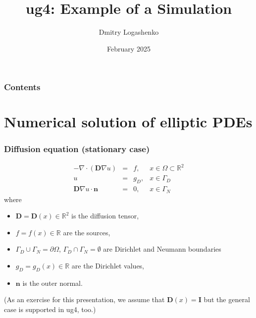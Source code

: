 \documentclass[xcolor=dvipsnames]{beamer}
\title
 [ug4: 1st simulation]
 {ug4: Example of a Simulation}
\author [D. Logashenko] {Dmitry Logashenko}
\institute [CEMSE]
{CEMSE, KAUST, Saudi Arabia}
\date [Feb. 2025] {February 2025}
\begin{document}
\frame {\titlepage}

\begin {frame} [t]
\frametitle {Contents}
\tableofcontents
\end {frame}

\section {Numerical solution of elliptic PDEs}

\begin {frame} [t]
\frametitle {Diffusion equation (stationary case)}
$$
 \begin{array} {rcll}
  - \nabla \cdot (\mathbf{D} \nabla u) & = & f, & x \in \Omega \subset \mathbb{R}^2 \\
  u & = & g_D, & x \in \Gamma_D \\
  \mathbf{D} \nabla u \cdot \mathbf{n} & = & 0, & x \in \Gamma_N 
 \end{array}
$$
where
\begin {itemize}
	\item $\mathbf{D} = \mathbf{D} (x) \in \mathbb{R}^2$ is the diffusion tensor,
	\item $f = f (x) \in \mathbb{R}$ are the sources,
	\item $\Gamma_D \cup \Gamma_N = \partial \Omega$, $\Gamma_D \cap \Gamma_N = \emptyset$
		are Dirichlet and Neumann boundaries
	\item $g_D = g_D (x) \in \mathbb{R}$ are the Dirichlet values,
	\item $\mathbf{n}$ is the outer normal.
\end {itemize}

\pause
\vspace {2ex}
(As an exercise for this presentation, we assume that $\mathbf{D} (x) = \mathbf{I}$
but the general case is supported in ug4, too.)
\end {frame}
\end{document}
